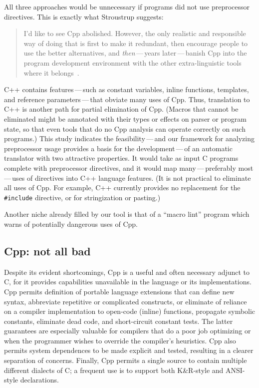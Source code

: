 \documentclass[11pt]{article}
\begin{document}
All three approaches would be unnecessary if programs did not use
preprocessor directives.  This is exactly what Stroustrup suggests:
\begin{quote}
  I'd like to see Cpp abolished.  However, the only realistic and
  responsible way of doing that is first to make it redundant, then
  encourage people to use the better alternatives, and {\em then\/}\,---\,years
  later\,---\,banish Cpp into the program development environment with the
  other extra-linguistic tools where it
  belongs~\cite[p.~426]{Stroustrup-DesignEvolution}.
\end{quote}
C++ contains features\,---\,such as constant variables, inline functions,
templates, and reference parameters\,---\,that obviate many uses of Cpp.
Thus, translation to C++ is another path for partial elimination of Cpp.
(Macros that cannot be eliminated might be annotated with their types or
effects on parser or program state, so that even tools that do no Cpp
analysis can operate correctly on such programs.)  This study indicates the
feasibility\,---\,and our framework for analyzing preprocessor usage
provides a basis for the development\,---\,of an automatic translator with
two attractive properties.  It would take as input C programs complete with
preprocessor directives, and it would map many\,---\,preferably
most\,---\,uses of directives into C++ language features.  (It is not
practical to eliminate all uses of Cpp.  For example, C++ currently
provides no replacement for the {\tt \#include} directive, or for
stringization or pasting.)

Another niche already filled by our tool is that of a ``macro lint''
program which warns of potentially dangerous uses of Cpp.


\subsection{Cpp: not all bad}

Despite its evident shortcomings, Cpp is a useful and often necessary
adjunct to C, for it provides capabilities unavailable in the language or
its implementations.  Cpp permits definition of portable language
extensions that can define new syntax, abbreviate repetitive or complicated
constructs, or eliminate of reliance on a compiler implementation to
open-code (inline) functions, propagate symbolic constants, eliminate dead
code, and short-circuit constant tests.  The latter guarantees are
especially valuable for compilers that do a poor job optimizing or when the
programmer wishes to override the compiler's heuristics.  Cpp also permits
system dependences to be made explicit and tested, resulting in a clearer
separation of concerns.  Finally, Cpp permits a single source to contain
multiple different dialects of C; a frequent use is to support both
K\&R-style and ANSI-style declarations.
\end{document}
